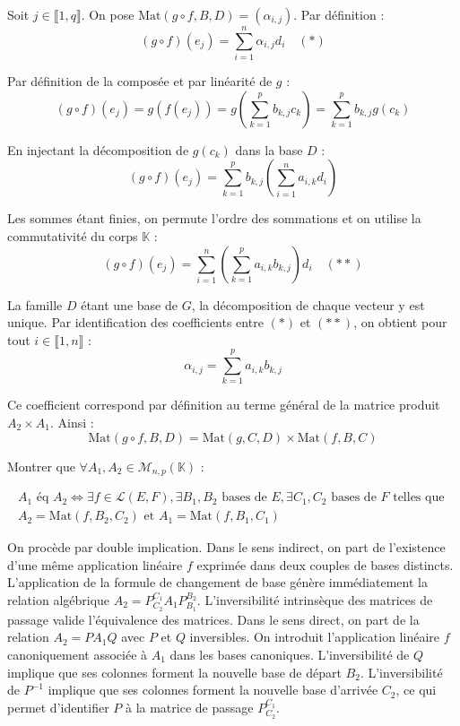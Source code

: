 \documentclass[11pt, a4paper]{article}
\theoremstyle{definition}
\begin{document}
Soit $j \in \llbracket 1,q \rrbracket$. On pose $\mathrm{Mat}(g \circ f, B, D) = (\alpha_{i,j})$. Par définition :
$$(g \circ f)(e_j) = \sum_{i=1}^n \alpha_{i,j} d_i \quad (\ast)$$

Par définition de la composée et par linéarité de $g$ :
$$(g \circ f)(e_j) = g\left(f(e_j)\right) = g\left(\sum_{k=1}^p b_{k,j} c_k\right) = \sum_{k=1}^p b_{k,j} g(c_k)$$

En injectant la décomposition de $g(c_k)$ dans la base $D$ :
$$(g \circ f)(e_j) = \sum_{k=1}^p b_{k,j} \left(\sum_{i=1}^n a_{i,k} d_i\right)$$

Les sommes étant finies, on permute l'ordre des sommations et on utilise la commutativité du corps $\mathbb{K}$ :
$$(g \circ f)(e_j) = \sum_{i=1}^n \left(\sum_{k=1}^p a_{i,k} b_{k,j}\right) d_i \quad (\ast\ast)$$

La famille $D$ étant une base de $G$, la décomposition de chaque vecteur y est unique. Par identification des coefficients entre $(\ast)$ et $(\ast\ast)$, on obtient pour tout $i \in \llbracket 1,n \rrbracket$ :
$$\alpha_{i,j} = \sum_{k=1}^p a_{i,k} b_{k,j}$$

Ce coefficient correspond par définition au terme général de la matrice produit $A_2 \times A_1$. Ainsi :
$$\mathrm{Mat}(g \circ f, B, D) = \mathrm{Mat}(g, C, D) \times \mathrm{Mat}(f, B, C)$$

\clearpage

\begin{tcolorbox}[instructionstyle]
	Montrer que $\forall A_1, A_2 \in \mathcal M_{n,p}(\mathbb K)$ :
	
	\begin{gather*}
		A_1 \text{ éq } A_2 \iff \exists f \in \mathcal L(E,F), \exists B_1,B_2 \text{ bases de } E, \exists C_1,C_2 \text{ bases de } F \text{ telles que }
		\\
		A_2 = \mathrm{Mat}(f,B_2,C_2) \text{ et } A_1 = \mathrm{Mat}(f,B_1,C_1)
	\end{gather*}
\end{tcolorbox}

\begin{tcolorbox}[methodstyle]
    On procède par double implication. Dans le sens indirect, on part de l'existence d'une même application linéaire $f$ exprimée dans deux couples de bases distincts. L'application de la formule de changement de base génère immédiatement la relation algébrique $A_2 = P_{C_2}^{C_1} A_1 P_{B_1}^{B_2}$. L'inversibilité intrinsèque des matrices de passage valide l'équivalence des matrices. Dans le sens direct, on part de la relation $A_2 = P A_1 Q$ avec $P$ et $Q$ inversibles. On introduit l'application linéaire $f$ canoniquement associée à $A_1$ dans les bases canoniques. L'inversibilité de $Q$ implique que ses colonnes forment la nouvelle base de départ $B_2$. L'inversibilité de $P^{-1}$ implique que ses colonnes forment la nouvelle base d'arrivée $C_2$, ce qui permet d'identifier $P$ à la matrice de passage $P_{C_2}^{C_1}$.
\end{tcolorbox}
\end{document}
